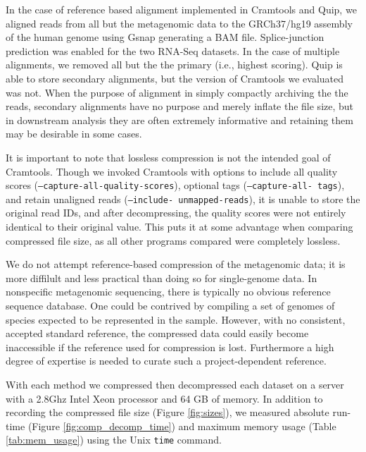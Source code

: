 \documentclass[twocolumn]{article}
\begin{document}

In the case of reference based alignment implemented in Cramtools and Quip, we
aligned reads from all but the metagenomic data to the GRCh37/hg19 assembly of
the human genome using Gsnap generating a BAM file. Splice-junction prediction
was enabled for the two RNA-Seq datasets. In the case of multiple alignments,
we removed all but the the primary (i.e., highest scoring). Quip is able to
store secondary alignments, but the version of Cramtools we evaluated was not.
When the purpose of alignment in simply compactly archiving the the reads,
secondary alignments have no purpose and merely inflate the file size, but in
downstream analysis they are often extremely informative and retaining them
may be desirable in some cases.


It is important to note that lossless compression is not the intended goal of
Cramtools. Though we invoked Cramtools with options to include all quality
scores (\texttt{--capture-all-quality-scores}), optional tags (\texttt
{--capture-all- tags}), and retain unaligned reads (\texttt{--include-
unmapped-reads}), it is unable to store the original read IDs, and after
decompressing, the quality scores were not entirely identical to their
original value. This puts it at some advantage when comparing compressed file
size, as all other programs compared were completely lossless.


We do not attempt reference-based compression of the metagenomic data; it is
more diffilult and less practical than doing so for single-genome data. In
nonspecific metagenomic sequencing, there is typically no obvious reference
sequence database. One could be contrived by compiling a set of genomes of
species expected to be represented in the sample. However, with no consistent,
accepted standard reference, the compressed data could easily become
inaccessible if the reference used for compression is lost. Furthermore a high
degree of expertise is needed to curate such a project-dependent reference.


With each method we compressed then decompressed each dataset on a server with
a 2.8Ghz Intel Xeon processor and 64 GB of memory. In addition to recording
the compressed file size (Figure \ref{fig:sizes}), we measured absolute run-
time (Figure \ref{fig:comp_decomp_time}) and maximum memory usage (Table
\ref{tab:mem_usage}) using the Unix \texttt{time} command.
\end{document}
